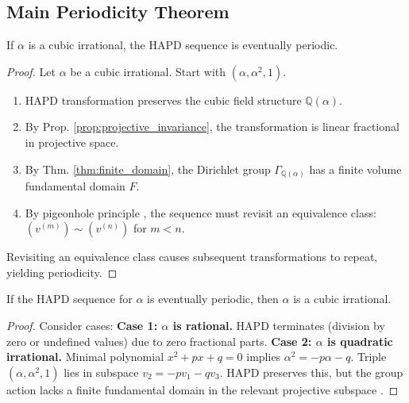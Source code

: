 \subsection{Main Periodicity Theorem}

\begin{theorem}\label{thm:cubic_periodic_detailed}
If $\alpha$ is a cubic irrational, the HAPD sequence is eventually periodic.
\end{theorem}

\begin{proof}
Let $\alpha$ be a cubic irrational. Start with $(\alpha, \alpha^2, 1)$.
\begin{enumerate}
    \item HAPD transformation preserves the cubic field structure $\mathbb{Q}(\alpha)$.
    \item By Prop. \ref{prop:projective_invariance}, the transformation is linear fractional in projective space.
    \item By Thm. \ref{thm:finite_domain}, the Dirichlet group $\Gamma_{\mathbb{Q}(\alpha)}$ has a finite volume fundamental domain $F$.
    \item By pigeonhole principle \cite{Schmidt1980}, the sequence must revisit an equivalence class: $(v^{(m)}) \sim (v^{(n)})$ for $m < n$.
\end{enumerate}
Revisiting an equivalence class causes subsequent transformations to repeat, yielding periodicity.
\end{proof}

\begin{theorem}\label{thm:only_cubic_periodic_detailed}
If the HAPD sequence for $\alpha$ is eventually periodic, then $\alpha$ is a cubic irrational.
\end{theorem}

\begin{proof}
Consider cases:
\textbf{Case 1: $\alpha$ is rational.} HAPD terminates (division by zero or undefined values) due to zero fractional parts.
\textbf{Case 2: $\alpha$ is quadratic irrational.} Minimal polynomial $x^2+px+q=0$ implies $\alpha^2 = -p\alpha - q$. Triple $(\alpha, \alpha^2, 1)$ lies in subspace $v_2 = -pv_1 - qv_3$. HAPD preserves this, but the group action lacks a finite fundamental domain in the relevant projective subspace \cite{Khinchin1964}.
\end{proof}
